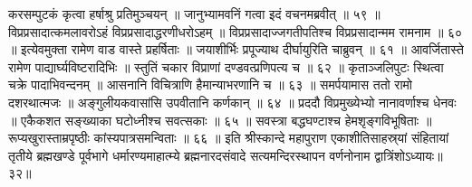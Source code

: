 करसम्पुटकं कृत्वा हर्षाश्रु प्रतिमुञ्चयन् ॥
जानुभ्यामवनिं गत्वा इदं वचनमब्रवीत् ॥ ५९ ॥
विप्रप्रसादात्कमलावरोऽहं विप्रप्रसादाद्धरणीधरोऽहम् ॥
विप्रप्रसादाज्जगतीपतिश्च विप्रप्रसादान्मम रामनाम ॥ ६० ॥
इत्येवमुक्ता रामेण वाड वास्ते प्रहर्षिताः ॥
जयाशीर्भिः प्रपूज्याथ दीर्घायुरिति चाब्रुवन् ॥ ६१ ॥
आवर्जितास्ते रामेण पाद्यार्घ्यविष्टरादिभिः ॥
स्तुतिं चकार विप्राणां दण्डवत्प्रणिपत्य च ॥ ६२ ॥
कृताञ्जलिपुटः स्थित्वा चक्रे पादाभिवन्दनम् ॥
आसनानि विचित्राणि हैमान्याभरणानि च ॥ ६३ ॥
समर्पयामास ततो रामो दशरथात्मजः ॥
अङ्गुलीयकवासांसि उपवीतानि कर्णकान् ॥ ६४ ॥
प्रददौ विप्रमुख्येभ्यो नानावर्णाश्च धेनवः ॥
एकैकशत सङ्ख्याका घटोध्नीश्च सवत्सकाः ॥ ६५ ॥
सवस्त्रा बद्धघण्टाश्च हेमशृङ्गविभूषिताः ॥
रूप्यखुरास्ताम्रपृष्ठीः कांस्यपात्रसमन्विताः ॥ ६६ ॥
इति श्रीस्कान्दे महापुराण एकाशीतिसाहस्र्यां संहितायां तृतीये ब्रह्मखण्डे पूर्वभागे धर्मारण्यमाहात्म्ये ब्रह्मनारदसंवादे सत्यमन्दिरस्थापन वर्णनोनाम द्वात्रिंशोऽध्यायः॥३२॥

